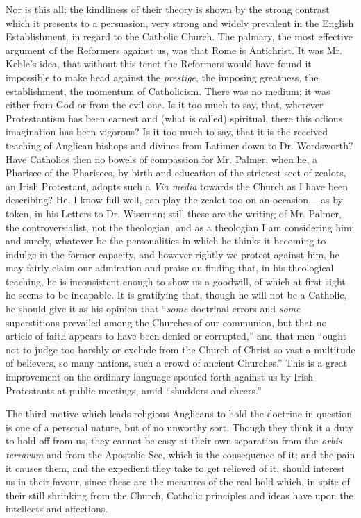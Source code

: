Nor is this all; the kindliness of their theory
is shown by the strong contrast which it presents to a persuasion,
very strong and widely prevalent in the English Establishment, in
regard to the Catholic Church. The palmary, the most effective
argument of the Reformers against us, was that Rome is Antichrist. It
was Mr. Keble's idea, that without this tenet the Reformers would have
found it impossible to make head against the \emph{prestige}, the
imposing greatness, the establishment, the momentum of Catholicism.
There was no medium; it was either from God or from the evil one. Is
it too much to say, that, wherever Protestantism has been earnest and
(what is called) spiritual, there this odious imagination has
been vigorous? Is it too much to say, that it is the received teaching
of Anglican bishops and divines from Latimer down to Dr. Wordsworth?
Have Catholics then no bowels of compassion for Mr. Palmer, when he, a
Pharisee of the Pharisees, by birth and education of the strictest
sect of zealots, an Irish Protestant, adopts such a \emph{Via media}
towards the Church as I have been describing? He, I know full well,
can play the zealot too on an occasion,—as by token, in his Letters
to Dr. Wiseman; still these are the writing of Mr. Palmer, the
controversialist, not the theologian, and as a theologian I am
considering him; and surely, whatever be the personalities in which he
thinks it becoming to indulge in the former capacity, and however
rightly we protest against him, he may fairly claim our admiration and
praise on finding that, in his theological teaching, he is
inconsistent enough to show us a goodwill, of which at first sight he
seems to be incapable. It is gratifying that, though he will not be a
Catholic, he should give it as his opinion that ``\emph{some} doctrinal errors
and \emph{some} superstitions prevailed among the Churches of our communion,
but that no article of faith appears to have been denied or corrupted,''
and that men ``ought not to judge too harshly or exclude from the
Church of Christ so vast a multitude of believers, so many nations,
such a crowd of ancient Churches.'' This is a great improvement on the
ordinary language spouted forth against us by Irish Protestants at
public meetings, amid ``shudders and cheers.''

The third motive which leads religious Anglicans
to hold the doctrine in question is one of a personal nature, but of
no unworthy sort. Though they think it a duty to hold off from us,
they cannot be easy at their own separation from the \emph{orbis terrarum}
and from the Apostolic See, which is the consequence of it; and
the pain it causes them, and the expedient they take to get relieved
of it, should interest us in their favour, since these are the
measures of the real hold which, in spite of their still shrinking
from the Church, Catholic principles and ideas have upon the
intellects and affections.

